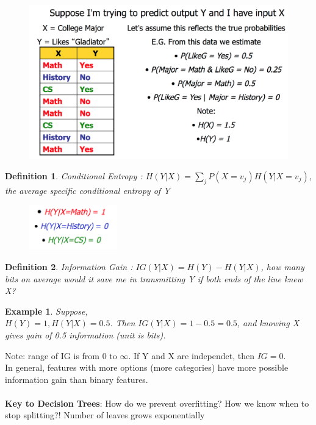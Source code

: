 \documentclass[a4paper]{article}\usepackage[]{graphicx}\usepackage[]{color}
\newtheorem{defn}{Definition}[section]
\newtheorem{ex}{Example}[section]
\begin{document}
\begin{figure}[H]
\centering
\includegraphics[width=6in]{cond_ent_ex.png}
\end{figure}

\begin{defn}
Conditional Entropy : $H(Y|X)=\sum_j P(X=v_j)H(Y|X=v_j)$, the average specific conditional entropy of Y 
\end{defn}


\begin{figure}[H]
\centering
\includegraphics[width=1.5in]{specific_condent.png}
\end{figure}

\begin{defn}
Information Gain : $IG(Y|X) = H(Y)-H(Y|X)$, how many bits on average would it save me in transmitting Y if both ends of the line knew X? 
\end{defn}

\begin{ex}
Suppose, \\
$H(Y)=1, H(Y|X)=0.5$. Then $IG(Y|X) = 1-0.5=0.5$, and knowing X gives gain of 0.5 information (unit is bits). 
\end{ex}

Note: range of IG is from 0 to $\infty$. If Y and X are independet, then $IG=0$. \\
In general, features with more options (more categories) have more possible information gain than binary features. \\
\\
\textbf{Key to Decision Trees}: How do we prevent overfitting? How we know when to stop splitting?! Number of leaves grows exponentially
\end{document}
